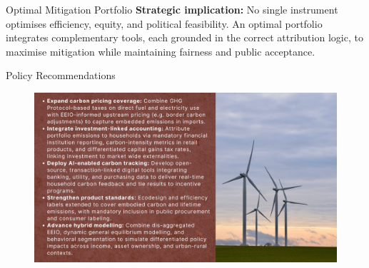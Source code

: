 \documentclass{beamer}
\begin{document}
\begin{frame}{Optimal Mitigation Portfolio}
\footnotesize
 \textbf{Strategic implication:}  
    No single instrument optimises efficiency, equity, and political feasibility.  
    An optimal portfolio integrates complementary tools, each grounded in the correct attribution logic, to maximise mitigation while maintaining fairness and public acceptance.
\end{frame}

\begin{frame}{Policy Recommendations}
  \pause
  \vspace{-2.5em}
\begin{figure}
\includegraphics[width=\linewidth]{Policy Recommendation.png}
\end{figure}
\end{frame}
\end{document}
